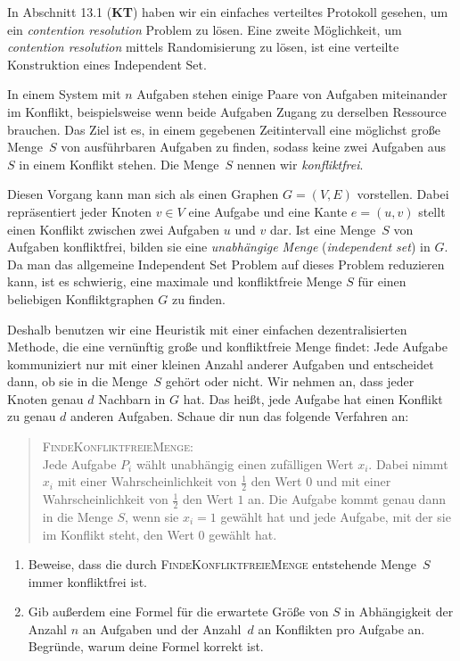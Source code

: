 \documentclass{uebung_cs}
\begin{document}
\begin{exercise}
	In Abschnitt 13.1 (\textbf{KT}) haben wir ein einfaches verteiltes Protokoll gesehen, um ein \textit{contention resolution} Problem zu lösen. Eine zweite Möglichkeit, um \textit{contention resolution} mittels Randomisierung zu lösen, ist eine verteilte Konstruktion eines Independent Set.

	In einem System mit $n$ Aufgaben stehen einige Paare von Aufgaben miteinander im Konflikt, beispielsweise wenn beide Aufgaben Zugang zu derselben Ressource brauchen. Das Ziel ist es, in einem gegebenen Zeitintervall eine möglichst große Menge~$S$ von ausführbaren Aufgaben zu finden, sodass keine zwei Aufgaben aus $S$ in einem Konflikt stehen. Die Menge~$S$ nennen wir \textit{konfliktfrei}.
	
	Diesen Vorgang kann man sich als einen Graphen $G = (V,E)$ vorstellen. Dabei repräsentiert jeder Knoten $v \in V$ eine Aufgabe und eine Kante $e = (u,v)$ stellt einen Konflikt zwischen zwei Aufgaben $u$ und $v$ dar. Ist eine Menge~$S$ von Aufgaben konfliktfrei, bilden sie eine \emph{unabhängige Menge} (\emph{independent set}) in $G$. 
	Da man das allgemeine Independent Set Problem auf dieses Problem reduzieren kann, ist es schwierig, eine maximale und konfliktfreie Menge $S$ für einen beliebigen Konfliktgraphen $G$ zu finden. 
	
	Deshalb benutzen wir eine Heuristik mit einer einfachen dezentralisierten Methode, die eine vernünftig große und konfliktfreie Menge findet: Jede Aufgabe kommuniziert nur mit einer kleinen Anzahl anderer Aufgaben und entscheidet dann, ob sie in die Menge~$S$ gehört oder nicht.
	Wir nehmen an, dass jeder Knoten genau $d$ Nachbarn in $G$ hat. Das heißt, jede Aufgabe hat einen Konflikt zu genau $d$ anderen Aufgaben. Schaue dir nun das folgende Verfahren an:
	
	\begin{quote}
		\textsc{FindeKonfliktfreieMenge}: \\
		Jede Aufgabe $P_i$ wählt unabhängig einen zufälligen Wert $x_i$. Dabei nimmt $x_i$ mit einer Wahrscheinlichkeit von $\frac{1}{2}$ den Wert $0$ und mit einer Wahrscheinlichkeit von $\frac{1}{2}$ den Wert $1$ an. Die Aufgabe kommt genau dann in die Menge $S$, wenn sie $x_i = 1$ gewählt hat und jede Aufgabe, mit der sie im Konflikt steht, den Wert $0$ gewählt hat.
	\end{quote}
	
		\begin{enumerate}
		\item Beweise, dass die durch \textsc{FindeKonfliktfreieMenge} entstehende Menge~$S$ immer konfliktfrei ist.
		\item Gib außerdem eine Formel für die erwartete Größe von $S$ in Abhängigkeit der Anzahl $n$ an Aufgaben und der Anzahl~$d$ an Konflikten pro Aufgabe an. Begründe, warum deine Formel korrekt ist.
	\end{enumerate}
\end{exercise}
\end{document}
